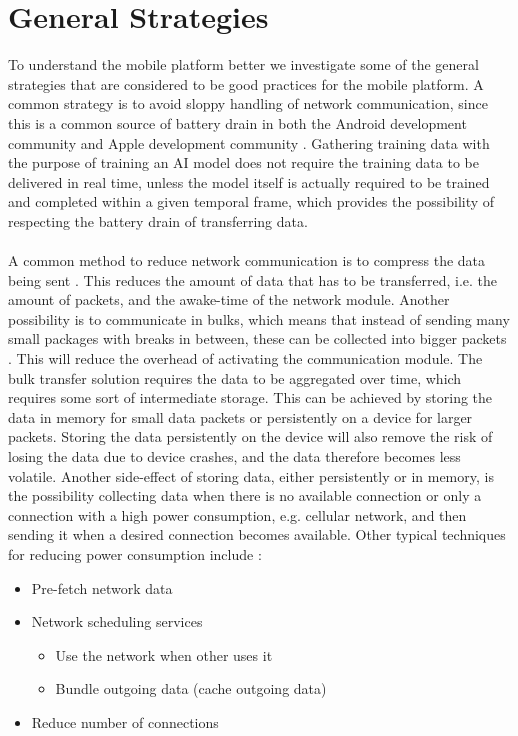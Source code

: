 
\section{General Strategies}
\label{sec:general_strategies}
To understand the mobile platform better we investigate some of the general strategies that are considered to be good practices for the mobile platform. A common strategy is to avoid sloppy handling of network communication, since this is a common source of battery drain in both the Android development community \parencite{android_network_scheduling} and Apple development community \parencite{iphone_network_scheduling}. Gathering training data with the purpose of training an AI model does not require the training data to be delivered in real time, unless the model itself is actually required to be trained and completed within a given temporal frame, which provides the possibility of respecting the battery drain of transferring data. 
\\\\
A common method to reduce network communication is to compress the data being sent \parencite{har_wearables}\parencite{android_network_scheduling}. This reduces the amount of data that has to be transferred, i.e. the amount of packets, and the awake-time of the network module. Another possibility is to communicate in bulks, which means that instead of sending many small packages with breaks in between, these can be collected into bigger packets \parencite{android_network_scheduling}. This will reduce the overhead of activating the communication module. The bulk transfer solution requires the data to be aggregated over time, which requires some sort of intermediate storage. This can be achieved by storing the data in memory for small data packets or persistently on a device for larger packets. Storing the data persistently on the device will also remove the risk of losing the data due to device crashes, and the data therefore becomes less volatile. Another side-effect of storing data, either persistently or in memory, is the possibility collecting data when there is no available connection or only a connection with a high power consumption, e.g. cellular network, and then sending it when a desired connection becomes available. Other typical techniques for reducing power consumption include \parencite{android_network_scheduling}:

\begin{itemize}
	\setlength\itemsep{-0.3em}
    \item Pre-fetch network data
    \item Network scheduling services
    \vspace{-0.8em}
    \begin{itemize}
    	\setlength\itemsep{-0.3em}
    	\item Use the network when other uses it
        \item Bundle outgoing data (cache outgoing data)
    \end{itemize}
    \vspace{-0.6em}
    \item Reduce number of connections
\end{itemize}

